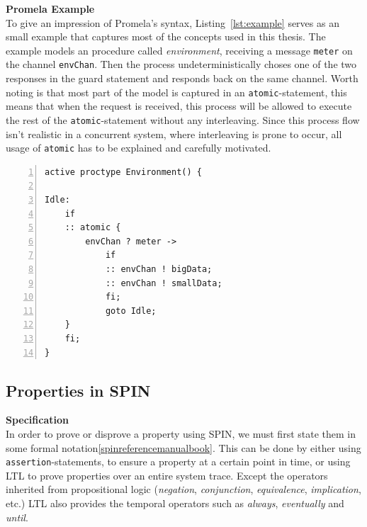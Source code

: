 
\textbf{Promela Example} \\

To give an impression of Promela's syntax, Listing~\ref{lst:example} serves as an small example that captures most of the concepts used in this thesis. The example models an procedure called \textit{environment}, receiving a message \texttt{meter} on the channel \texttt{envChan}. Then the process undeterministically choses one of the two responses in the guard statement and responds back on the same channel. Worth noting is that most part of the model is captured in an \texttt{atomic}-statement, this means that when the request is received, this process will be allowed to execute the rest of the \texttt{atomic}-statement without any interleaving. 
Since this process flow isn't realistic in a concurrent system, where interleaving is prone to occur, all usage of \texttt{atomic} has to be explained and carefully motivated. 

\begin{lstlisting}[caption={Promela Example},label={lst:example},language=Promela, numbers=left, basicstyle=\footnotesize, tabsize=2]
active proctype Environment() {

Idle:  
	if
	:: atomic { 
		envChan ? meter ->  
			if
			:: envChan ! bigData;
			:: envChan ! smallData;
			fi; 
			goto Idle;
	}
	fi;
}
\end{lstlisting}

\subsection{Properties in SPIN}



\textbf{Specification} \\

In order to prove or disprove a property using SPIN, we must first state them in some formal notation\ref{spinreferencemanualbook}. This can be done by either using \texttt{assertion}-statements, to ensure a property at a certain point in time, or using LTL to prove properties over an entire system trace. 
Except the operators inherited from propositional logic (\textit{negation}, \textit{conjunction}, \textit{equivalence}, \textit{implication}, etc.) LTL also provides the temporal operators such as \textit{always}, \textit{eventually} and \textit{until}. 

